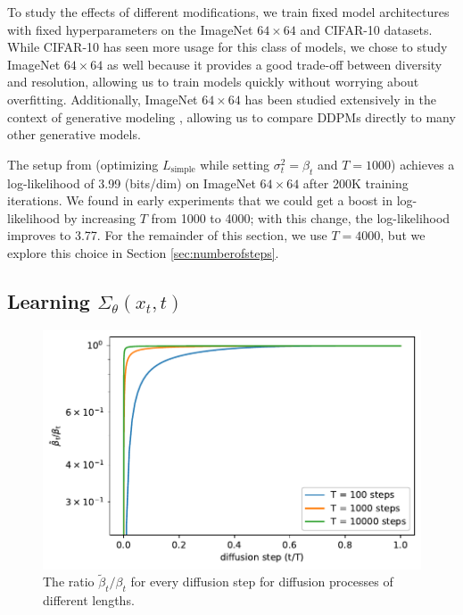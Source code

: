 \documentclass{article}
\begin{document}
To study the effects of different modifications, we train fixed model architectures with fixed hyperparameters on the ImageNet $64 \times 64$ \citep{imagenet64} and CIFAR-10 \citep{cifar10} datasets. While CIFAR-10 has seen more usage for this class of models, we chose to study ImageNet $64 \times 64$ as well because it provides a good trade-off between diversity and resolution, allowing us to train models quickly without worrying about overfitting. Additionally, ImageNet $64 \times 64$ has been studied extensively in the context of generative modeling \citep{pixelcnn,spn,sparsetransformer,routingtransformer}, allowing us to compare DDPMs directly to many other generative models.

The setup from \citet{ddpm} (optimizing $L_{\text{simple}}$ while setting $\sigma_t^2 = \beta_t$ and $T = 1000$) achieves a log-likelihood of 3.99 (bits/dim) on ImageNet $64 \times 64$ after 200K training iterations. We found in early experiments that we could get a boost in log-likelihood by increasing $T$ from 1000 to 4000; with this change, the log-likelihood improves to 3.77. For the remainder of this section, we use $T = 4000$, but we explore this choice in Section \ref{sec:numberofsteps}.

\subsection{Learning $\Sigma_{\theta}(x_t, t)$}
\label{sec:learnsigma}

\begin{figure}[ht]
\begin{center}
\centerline{\includegraphics[width=0.8\columnwidth]{variance_ratio-eps.pdf}}
\caption{\label{fig:sigmaratio} The ratio $\tilde{\beta}_t / \beta_t$ for every diffusion step for diffusion processes of different lengths.}
\end{center}
\vskip -0.4in
\end{figure}
\end{document}
